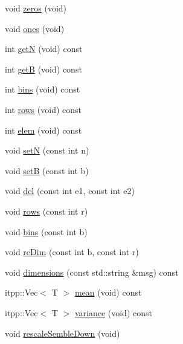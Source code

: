 \begin{DoxyCompactItemize}
\item 
void \mbox{\hyperlink{structSEMBLE_1_1SembleVector_a17337e7001050f08298608379aa6504c}{zeros}} (void)
\item 
void \mbox{\hyperlink{structSEMBLE_1_1SembleVector_aebc4ff68f93d72431d206ba9bcbb78fb}{ones}} (void)
\item 
int \mbox{\hyperlink{structSEMBLE_1_1SembleVector_aef7c2b90fc42f7d3a9dadf6e00f18add}{getN}} (void) const
\item 
int \mbox{\hyperlink{structSEMBLE_1_1SembleVector_a30ac55c6514b63443ad073ccc4913051}{getB}} (void) const
\item 
int \mbox{\hyperlink{structSEMBLE_1_1SembleVector_a5820189cbbd205f6a7e134c0879b993b}{bins}} (void) const
\item 
int \mbox{\hyperlink{structSEMBLE_1_1SembleVector_a2d225b0e49bb4b0c1c9fd3f9202a48e5}{rows}} (void) const
\item 
int \mbox{\hyperlink{structSEMBLE_1_1SembleVector_a4054d66d607dbedd52f2d11cd9d1086c}{elem}} (void) const
\item 
void \mbox{\hyperlink{structSEMBLE_1_1SembleVector_a7ca12dcc693c8395ddd4ec544330db82}{setN}} (const int n)
\item 
void \mbox{\hyperlink{structSEMBLE_1_1SembleVector_a9f30d2d19ce553c89a695905f770a3d4}{setB}} (const int b)
\item 
void \mbox{\hyperlink{structSEMBLE_1_1SembleVector_a50da934be7c3c32c09b2ab8454a9c1b5}{del}} (const int e1, const int e2)
\item 
void \mbox{\hyperlink{structSEMBLE_1_1SembleVector_ab123cb720f7df7ec85a288ea2e8c8338}{rows}} (const int r)
\item 
void \mbox{\hyperlink{structSEMBLE_1_1SembleVector_ab899172400d619e7564ac483945e5578}{bins}} (const int b)
\item 
void \mbox{\hyperlink{structSEMBLE_1_1SembleVector_a145668e54bc3ebd9a47e7bfd2646947a}{re\+Dim}} (const int b, const int r)
\item 
void \mbox{\hyperlink{structSEMBLE_1_1SembleVector_a17041e449089853ef9184a79c4cae67c}{dimensions}} (const std\+::string \&msg) const
\item 
itpp\+::\+Vec$<$ T $>$ \mbox{\hyperlink{structSEMBLE_1_1SembleVector_aaac1723366a1522771a7bb57edea1bfb}{mean}} (void) const
\item 
itpp\+::\+Vec$<$ T $>$ \mbox{\hyperlink{structSEMBLE_1_1SembleVector_ae871833a81a7133e0bbefaac47017c3a}{variance}} (void) const
\item 
void \mbox{\hyperlink{structSEMBLE_1_1SembleVector_a749affd5efb20a00291f27bf034728cd}{rescale\+Semble\+Down}} (void)

\end{DoxyCompactItemize}
